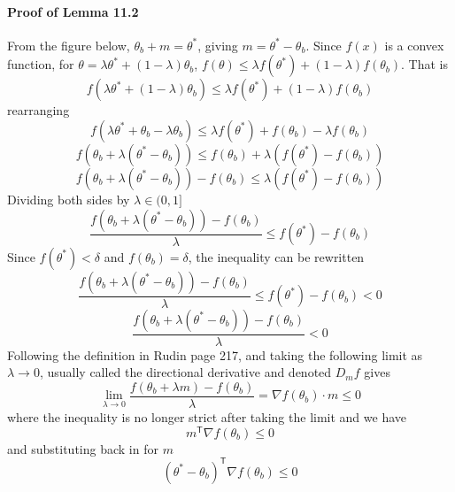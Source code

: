 \paragraph{Proof of Lemma 11.2} From the figure below, $\theta_{b}+m=\theta^{*}$, giving $m=\theta^{*}-\theta_{b}$.
Since $f(x)$ is a convex function, for $\theta=\lambda\theta^{*}+(1-\lambda)\theta_{b}$, $f(\theta)\leq\lambda f(\theta^{*})+(1-\lambda)f(\theta_{b})$.
That is
\begin{equation*}
  f(\lambda\theta^{*}+(1-\lambda)\theta_{b})\leq\lambda f(\theta^{*})+(1-\lambda)f(\theta_{b})
\end{equation*}
rearranging
\begin{equation*}
  f(\lambda\theta^{*}+\theta_{b}-\lambda\theta_{b})\leq\lambda f(\theta^{*})+f(\theta_{b})-\lambda f(\theta_{b})
\end{equation*}
\begin{equation*}
  f(\theta_{b}+\lambda(\theta^{*}-\theta_{b}))\leq f(\theta_{b})+\lambda( f(\theta^{*})-f(\theta_{b}))
\end{equation*}
\begin{equation*}
  f(\theta_{b}+\lambda(\theta^{*}-\theta_{b}))-f(\theta_{b})\leq\lambda( f(\theta^{*})-f(\theta_{b}))
\end{equation*}
Dividing both sides by $\lambda\in(0,1]$ %
\begin{equation*}
  \frac{f(\theta_{b}+\lambda(\theta^{*}-\theta_{b}))-f(\theta_{b})}{\lambda}\leq f(\theta^{*})-f(\theta_{b})
\end{equation*}
Since $f(\theta^{*})<\delta$ and $f(\theta_{b})=\delta$, the inequality can be rewritten
\begin{equation*}
  \frac{f(\theta_{b}+\lambda(\theta^{*}-\theta_{b}))-f(\theta_{b})}{\lambda}\leq f(\theta^{*})-f(\theta_{b})<0
\end{equation*}
\begin{equation*}
  \frac{f(\theta_{b}+\lambda(\theta^{*}-\theta_{b}))-f(\theta_{b})}{\lambda}<0
\end{equation*}
Following the definition in Rudin page 217, and taking the following limit as $\lambda\rightarrow0$, usually called the directional derivative and denoted $D_{m}f$ gives
\begin{equation*}
  \lim_{\lambda\rightarrow0}\frac{f(\theta_{b}+\lambda m)-f(\theta_{b})}{\lambda}=\nabla f(\theta_{b})\cdot m\leq0
\end{equation*}
where the inequality is no longer strict after taking the limit and we have
\begin{equation*}
  m^{\mathsf{T}}\nabla f(\theta_{b})\leq0
\end{equation*}
and substituting back in for $m$
\begin{equation*}
  (\theta^{*}-\theta_{b})^{\mathsf{T}}\nabla f(\theta_{b})\leq0
\end{equation*}


